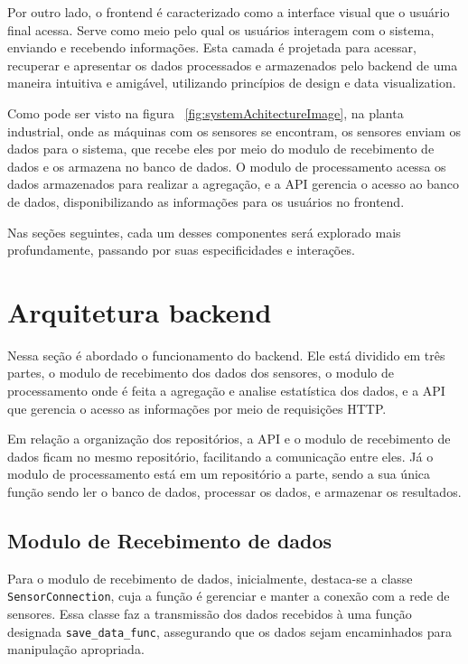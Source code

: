 Por outro lado, o frontend é caracterizado como a interface visual que o usuário final acessa. Serve como meio pelo qual os usuários interagem com o sistema, enviando e recebendo informações. Esta camada é projetada para acessar, recuperar e apresentar os dados processados e armazenados pelo backend de uma maneira intuitiva e amigável, utilizando princípios de design e data visualization.

Como pode ser visto na figura ~\ref{fig:systemAchitectureImage}, na planta industrial, onde as máquinas com os sensores se encontram, os sensores enviam os dados para o sistema, que recebe eles por meio do modulo de recebimento de dados e os armazena no banco de dados. O modulo de processamento acessa os dados armazenados para realizar a agregação, e a API gerencia o acesso ao banco de dados, disponibilizando as informações para os usuários no frontend.

Nas seções seguintes, cada um desses componentes será explorado mais profundamente, passando por suas especificidades e interações.


\section[Arquitetura do backend]{Arquitetura backend}
Nessa seção é abordado o funcionamento do backend. Ele está dividido em três partes, o modulo de recebimento dos dados dos sensores, o modulo de processamento onde é feita a agregação e analise estatística dos dados, e a API que gerencia o acesso as informações por meio de requisições HTTP.

Em relação a organização dos repositórios, a API e o modulo de recebimento de dados ficam no mesmo repositório, facilitando a comunicação entre eles. Já o modulo de processamento está em um repositório a parte, sendo a sua única função sendo ler o banco de dados, processar os dados, e armazenar os resultados.

\subsection{Modulo de Recebimento de dados}
Para o modulo de recebimento de dados, inicialmente, destaca-se a classe \texttt{SensorConnection}, cuja a função é gerenciar e manter a conexão com a rede de sensores. Essa classe faz a transmissão dos dados recebidos à uma função designada \texttt{save\_data\_func}, assegurando que os dados sejam encaminhados para manipulação apropriada.

